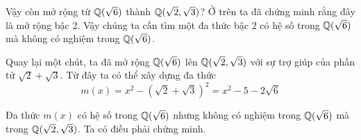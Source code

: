 Vậy còn mở rộng từ $\mathbb{Q}(\sqrt{6})$ thành $\mathbb{Q}(\sqrt{2}, \sqrt{3})$? Ở trên ta đã chứng minh rằng đây là mở rộng bậc 2. Vậy chúng ta cần tìm một đa thức bậc 2 có hệ số trong $\mathbb{Q}(\sqrt{6})$ mà không có nghiệm trong $\mathbb{Q}(\sqrt{6})$.

Quay lại một chút, ta đã mở rộng $\mathbb{Q}(\sqrt{6})$ lên $\mathbb{Q}(\sqrt{2}, \sqrt{3})$ với sự trợ giúp của phần tử $\sqrt{2} + \sqrt{3}$. Từ đây ta có thể xây dựng đa thức
\begin{equation*}
    m(x) = x^2 - (\sqrt{2} + \sqrt{3})^2 = x^2 - 5 - 2 \sqrt{6}
\end{equation*}

Đa thức $m(x)$ có hệ số trong $\mathbb{Q}(\sqrt{6})$ nhưng không có nghiệm trong $\mathbb{Q}(\sqrt{6})$ mà trong $\mathbb{Q}(\sqrt{2}, \sqrt{3})$. Ta có điều phải chứng minh.
